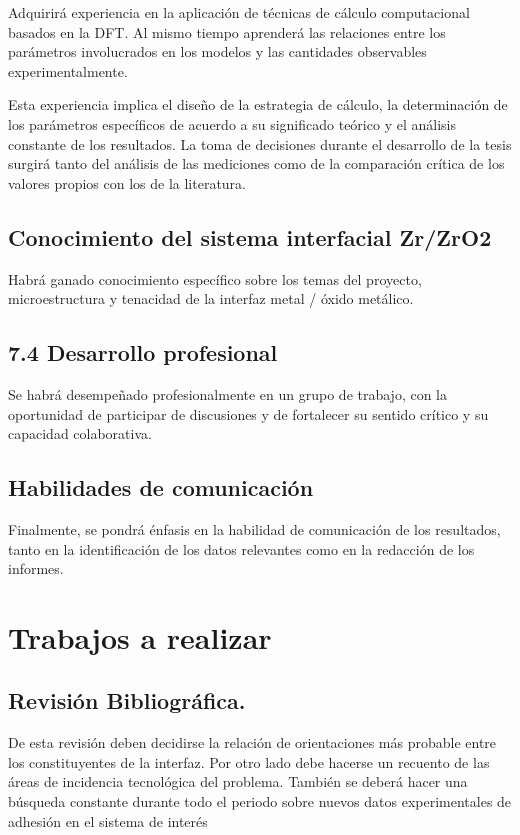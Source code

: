 Adquirirá experiencia en la aplicación de técnicas de cálculo computacional 
basados en la DFT. Al mismo tiempo aprenderá las relaciones entre los 
parámetros involucrados en los modelos y las cantidades observables 
experimentalmente.

Esta experiencia implica el diseño de la estrategia de cálculo, la 
determinación de los parámetros específicos de acuerdo a su significado teórico 
y el análisis constante de los resultados. La toma de decisiones durante el 
desarrollo de la tesis surgirá tanto del análisis de las mediciones como de la 
comparación crítica de los valores propios con los de la literatura.

\subsection{ Conocimiento del sistema interfacial Zr/ZrO2 }

Habrá ganado conocimiento específico sobre los temas del proyecto, 
microestructura y tenacidad de la interfaz metal / óxido metálico. 

\subsection{7.4  Desarrollo profesional}

Se habrá desempeñado profesionalmente en un grupo de trabajo, con la 
oportunidad de participar de discusiones y de fortalecer su sentido crítico y 
su capacidad colaborativa.

\subsection{ Habilidades de comunicación }

Finalmente, se pondrá énfasis en la habilidad de comunicación de los 
resultados, tanto en la identificación de los datos relevantes como en la 
redacción de los informes. 

\section{Trabajos a realizar}

\subsection{ Revisión Bibliográfica. }

De esta revisión deben decidirse la relación de orientaciones más probable 
entre los constituyentes de la interfaz. Por otro lado debe hacerse un recuento 
de las áreas de incidencia tecnológica del problema. También se deberá hacer 
una búsqueda constante durante todo el periodo sobre nuevos datos 
experimentales de adhesión en el sistema de interés

